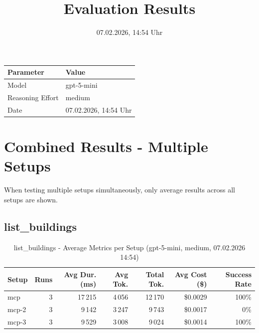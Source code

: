 \documentclass[a4paper,11pt]{article}
\title{Evaluation Results}
\date{07.02.2026, 14:54 Uhr}
\begin{document}
\maketitle

\begin{table}[H]
\centering
\begin{tabular}{l l}
\toprule
\textbf{Parameter} & \textbf{Value} \\
\midrule
Model & gpt-5-mini \\
Reasoning Effort & medium \\
Date & 07.02.2026, 14:54 Uhr \\
\bottomrule
\end{tabular}
\end{table}

\tableofcontents
\clearpage

\section{Combined Results - Multiple Setups}

When testing multiple setups simultaneously, only average results across all setups are shown.

\subsection{list\_buildings}

\begin{table}[H]
\centering
\scriptsize
\caption{list\_buildings - Average Metrics per Setup (gpt-5-mini, medium, 07.02.2026 14:54)}
\label{tab:combined\_list\_buildings\_metrics\_20260207}
\begin{tabular}{l r r r r r r}
\toprule
Setup & Runs & Avg Dur. (ms) & Avg Tok. & Total Tok. & Avg Cost (\$) & Success Rate \\
\midrule
mcp & 3 & 17\,215 & 4\,056 & 12\,170 & \$0.0029 & 100\% \\
mcp-2 & 3 & 9\,142 & 3\,247 & 9\,743 & \$0.0017 & 0\% \\
mcp-3 & 3 & 9\,529 & 3\,008 & 9\,024 & \$0.0014 & 100\% \\
\bottomrule
\end{tabular}
\end{table}
\end{document}

